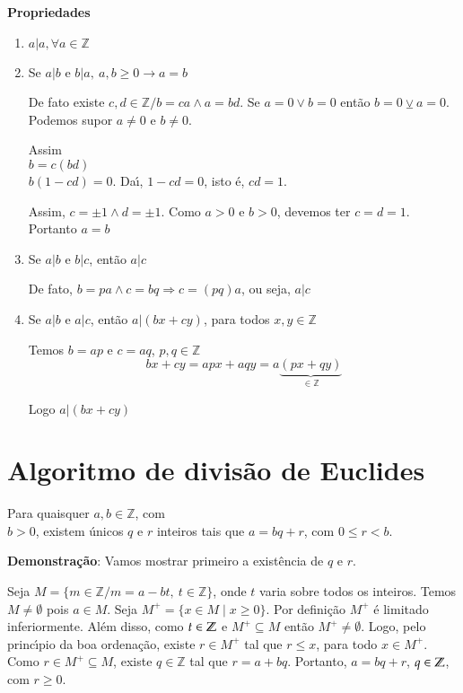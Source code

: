 \textbf{Propriedades}
\begin{enumerate}
\item $a|a, \forall a\in\mathbb{Z}$
\item Se $a|b$ e $b|a,\ a,b\geq 0\rightarrow a=b$

De fato existe $c,d\in\mathbb{Z}/b=ca\wedge a=bd$. Se $a=0\vee b=0$ ent{\~a}o $b=0\veebar a=0$. Podemos supor $a\neq 0$ e $b\neq 0$.

Assim\\
$b=c(bd)$\\
$b(1-cd)=0$. Da{\'\i}, $1-cd=0$, isto {\'e}, $cd=1$.

Assim, $c=\pm 1\wedge d=\pm 1$. Como $a>0$ e $b>0$, devemos ter $c=d=1$. Portanto $a=b$
\item Se $a|b$ e $b|c$, ent{\~a}o $a|c$

De fato, $b=pa\wedge c=bq \Rightarrow c=(pq)a$, ou seja, $a|c$
\item Se $a|b$ e $a|c$, ent{\~a}o $a|(bx+cy)$, para todos $x,y\in\mathbb{Z}$

Temos $b=ap$ e $c=aq$, $p,q\in\mathbb{Z}$
\[bx+cy=apx+aqy=a\underbrace{(px+qy)}_{\in\mathbb{Z}}\]

Logo $a|(bx+cy)$
\end{enumerate}

\section{Algoritmo de divis{\~a}o de Euclides}

\begin{teorema} Para quaisquer $a,b\in\mathbb{Z}$, com\\ $b>0$, existem {\'u}nicos $q$ e $r$ inteiros tais que $a=bq+r$, com $0\leq r<b$.\end{teorema}

\textbf{Demonstra{\c c}{\~a}o}: Vamos mostrar primeiro a exist{\^e}ncia de $q$ e $r$.

Seja $M=\{m\in\mathbb{Z}/m=a-bt,\ t\in\mathbb{Z}\}$, onde $t$ varia sobre todos os inteiros. Temos $M \ne \emptyset$ pois $a \in M$. Seja $M^+ = \{x \in M \mid x \ge 0\}$. Por definição $M^{+}$ {\'e} limitado inferiormente. Além disso, como $t \in \mathbb{Z}$ e $M^+ \subseteq M$ então $M^+ \ne \emptyset$. Logo, pelo princ{\'\i}pio da boa ordena{\c c}{\~a}o, existe $r \in M^{+}$ tal que $r\leq x$, para todo $x \in M^{+}$. Como $r\in M^{+}\subseteq M$, existe $q\in\mathbb{Z}$ tal que $r = a+bq$. Portanto, $a = bq+r$, $q \in \mathbb{Z}$, com $r \ge 0$.

